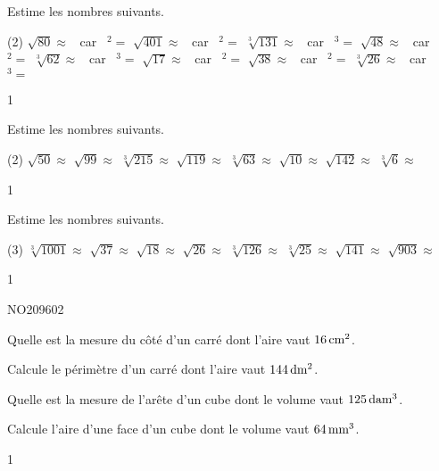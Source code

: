 \documentclass[a4paper,11pt]{report}
\begin{document}
\begin{exop}{
    Estime les nombres suivants.
    \begin{tasks}(2)
        \task $\sqrt{80}\approx$ \hrulefill ~car~ \hrulefill$^2=$\hrulefill
        \task $\sqrt{401}\approx$ \hrulefill ~car~ \hrulefill$^2=$\hrulefill
        \task $\sqrt[3]{131}\approx$ \hrulefill ~car~ \hrulefill$^3=$\hrulefill
        \task $\sqrt{48}\approx$ \hrulefill ~car~ \hrulefill$^2=$\hrulefill
        \task $\sqrt[3]{62}\approx$ \hrulefill ~car~ \hrulefill$^3=$\hrulefill
        \task $\sqrt{17}\approx$ \hrulefill ~car~ \hrulefill$^2=$\hrulefill
        \task $\sqrt{38}\approx$ \hrulefill ~car~ \hrulefill$^2=$\hrulefill
        \task $\sqrt[3]{26}\approx$ \hrulefill ~car~ \hrulefill$^3=$\hrulefill
    \end{tasks}
}{1}
\end{exop}

\begin{exop}{
    Estime les nombres suivants.
    \begin{tasks}(2)
        \task $\sqrt{50}\approx$
        \task $\sqrt{99}\approx$
        \task $\sqrt[3]{215}\approx$
        \task $\sqrt{119}\approx$
        \task $\sqrt[3]{63}\approx$
        \task $\sqrt{10}\approx$
        \task $\sqrt{142}\approx$
        \task $\sqrt[3]{6}\approx$
    \end{tasks}
}{1}
\end{exop}

\begin{exop}{
    Estime les nombres suivants.
    \begin{tasks}(3)
        \task $\sqrt[3]{1001}\approx$
        \task $\sqrt{37}\approx$
        \task $\sqrt{18}\approx$
        \task $\sqrt{26}\approx$
        \task $\sqrt[3]{126}\approx$
        \task $\sqrt[3]{25}\approx$
        \task $\sqrt{141}\approx$
        \task $\sqrt{903}\approx$
    \end{tasks}
}{1}
\end{exop}

\begin{exof}{NO209}{60}{2} %
\end{exof}


\begin{exo}{
\begin{tasks}
    
\task Quelle est la mesure du côté d'un carré dont l'aire vaut $\tunit{16}{\centi m^2}$.

\task Calcule le périmètre d'un carré dont l'aire vaut $\tunit{144}{\deci m^2}$.

\task Quelle est la mesure de l'arête d'un cube dont le volume vaut $\tunit{125}{\deca m^3}$.

\task Calcule l'aire d'une face d'un cube dont le volume vaut $\tunit{64}{\milli m^3}$.
\end{tasks}
}{1}
\end{exo}
\end{document}

